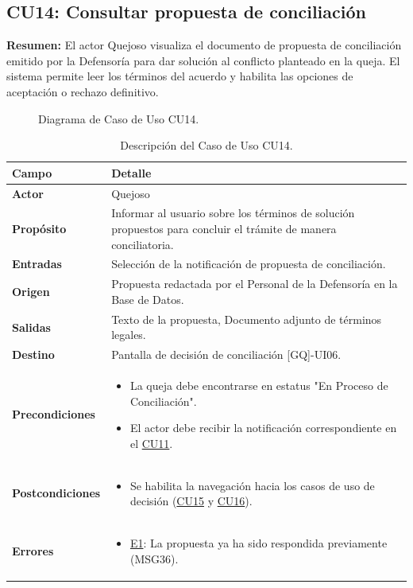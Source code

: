\begin{appendices}
\subsection{CU14: Consultar propuesta de conciliación}

\textbf{Resumen:} 
El actor Quejoso visualiza el documento de propuesta de conciliación emitido por la Defensoría para dar solución al conflicto planteado en la queja. El sistema permite leer los términos del acuerdo y habilita las opciones de aceptación o rechazo definitivo.

\begin{figure}[htbp]
    \centering
    \figCUcatorce
    \caption{Diagrama de Caso de Uso CU14.}
    \label{fig:cu14}
\end{figure}

\begin{table}[htbp]
\centering
\small
{}
\begin{tabular}{|p{3.5cm}|p{10.5cm}|}
\hline
\rowcolor[HTML]{EFEFEF} 
\textbf{Campo} & \textbf{Detalle} \\ \hline
\textbf{Actor} & Quejoso \\ \hline
\textbf{Propósito} & Informar al usuario sobre los términos de solución propuestos para concluir el trámite de manera conciliatoria. \\ \hline
\textbf{Entradas} & Selección de la notificación de propuesta de conciliación. \\ \hline
\textbf{Origen} & Propuesta redactada por el Personal de la Defensoría en la Base de Datos. \\ \hline
\textbf{Salidas} & Texto de la propuesta, Documento adjunto de términos legales. \\ \hline
\textbf{Destino} & Pantalla de decisión de conciliación [GQ]-UI06. \\ \hline
\textbf{Precondiciones} & 
\begin{itemize}[nosep, leftmargin=*]
    \item La queja debe encontrarse en estatus "En Proceso de Conciliación".
    \item El actor debe recibir la notificación correspondiente en el \hyperlink{anexo:casos_uso}{CU11}.
\end{itemize} \\ \hline
\textbf{Postcondiciones} & 
\begin{itemize}[nosep, leftmargin=*]
    \item Se habilita la navegación hacia los casos de uso de decisión (\hyperlink{anexo:casos_uso}{CU15} y \hyperlink{anexo:casos_uso}{CU16}).
\end{itemize} \\ \hline
\textbf{Errores} & 
\begin{itemize}[nosep, leftmargin=*]
    \item \hyperlink{err:E19}{E1}: La propuesta ya ha sido respondida previamente (MSG36).
\end{itemize} \\ \hline
\end{tabular}
\caption{Descripción del Caso de Uso CU14.}
\label{tab:cu14_especificacion}
\end{table}


\end{appendices}
